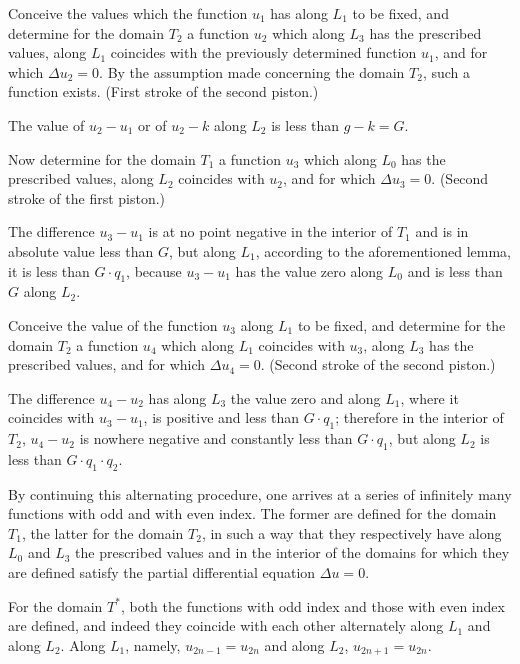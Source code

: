 \documentclass{article}
\begin{document}
Conceive the values which the function $u_1$ has along $L_1$ to be fixed, and determine for the
domain $T_2$ a function $u_2$ which along $L_3$ has the prescribed values, along $L_1$ coincides with the previously determined function $u_1$, and for which $\Delta u_2 = 0$. By the assumption made concerning the domain $T_2$, such a function exists. (First stroke of the second piston.)

The value of $u_2 - u_1$ or of $u_2 - k$ along $L_2$ is less than $g - k = G$.

Now determine for the domain $T_1$ a function $u_3$ which along $L_0$ has the prescribed values, along $L_2$ coincides with $u_2$, and for which $\Delta u_3 = 0$. (Second stroke of the first piston.)

The difference $u_3 - u_1$ is at no point negative in the interior of $T_1$ and is in absolute value less than $G$, but along $L_1$, according to the aforementioned lemma, it is less than $G \cdot q_1$, because $u_3 - u_1$ has the value zero along $L_0$ and is less than $G$ along $L_2$.

Conceive the value of the function $u_3$ along $L_1$ to be fixed, and determine for the domain $T_2$ a function $u_4$ which along $L_1$ coincides with $u_3$, along $L_3$ has the prescribed values, and for which $\Delta u_4 = 0$. (Second stroke of the second piston.)

The difference $u_4 - u_2$ has along $L_3$ the value zero and along $L_1$, where it coincides with $u_3 - u_1$, is positive and less than $G \cdot q_1$; therefore in the interior of $T_2$, $u_4 - u_2$ is nowhere negative and constantly less than $G \cdot q_1$, but along $L_2$ is less than $G \cdot q_1 \cdot q_2$.

By continuing this alternating procedure, one arrives at a series of infinitely many functions with odd and with even index. The former are defined for the domain $T_1$, the latter for the domain $T_2$, in such a way that they respectively have along
$L_0$ and $L_3$ the prescribed values and in the interior of the domains for which they are defined satisfy the partial differential equation $\Delta u = 0$.

For the domain $T^*$, both the functions with odd index and those with even index are defined, and indeed they coincide with each other alternately along $L_1$ and along $L_2$. Along $L_1$, namely, $u_{2n-1} = u_{2n}$ and along $L_2$, $u_{2n+1} = u_{2n}$.
\end{document}
